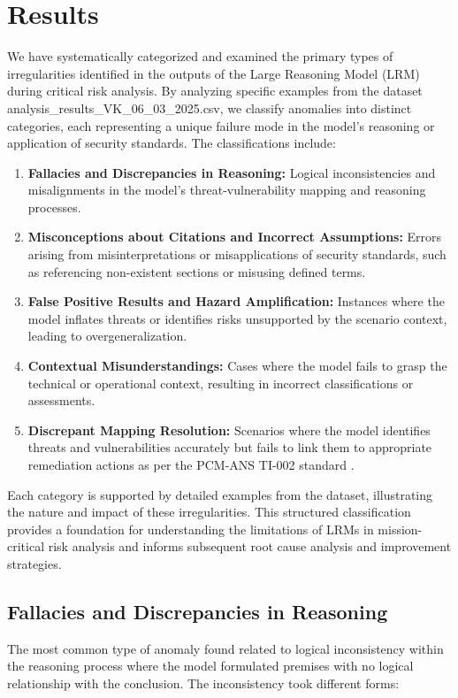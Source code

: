 \documentclass[sigconf]{acmart}
\begin{document}
\section{Results}
We have systematically categorized and examined the primary types of irregularities identified in the outputs of the Large Reasoning Model (LRM) during critical risk analysis. By analyzing specific examples from the dataset analysis\_results\_VK\_06\_03\_2025.csv, we classify anomalies into distinct categories, each representing a unique failure mode in the model's reasoning or application of security standards. The classifications include:
\begin{enumerate}
    \item \textbf{Fallacies and Discrepancies in Reasoning:} Logical inconsistencies and misalignments in the model's threat-vulnerability mapping and reasoning processes.
    
    \item \textbf{Misconceptions about Citations and Incorrect Assumptions:} Errors arising from misinterpretations or misapplications of security standards, such as referencing non-existent sections or misusing defined terms.
    
    \item \textbf{False Positive Results and Hazard Amplification:} Instances where the model inflates threats or identifies risks unsupported by the scenario context, leading to overgeneralization.
    
    \item \textbf{Contextual Misunderstandings:} Cases where the model fails to grasp the technical or operational context, resulting in incorrect classifications or assessments.
    
    \item \textbf{Discrepant Mapping Resolution:} Scenarios where the model identifies threats and vulnerabilities accurately but fails to link them to appropriate remediation actions as per the PCM-ANS TI-002 standard \citep{NationalSecurity1995}.
\end{enumerate}

Each category is supported by detailed examples from the dataset, illustrating the nature and impact of these irregularities. This structured classification provides a foundation for understanding the limitations of LRMs in mission-critical risk analysis and informs subsequent root cause analysis and improvement strategies.

\subsection{Fallacies and Discrepancies in Reasoning}
The most common type of anomaly found related to logical inconsistency within the reasoning process where the model formulated premises with no logical relationship with the conclusion. The inconsistency took different forms: 
\end{document}
